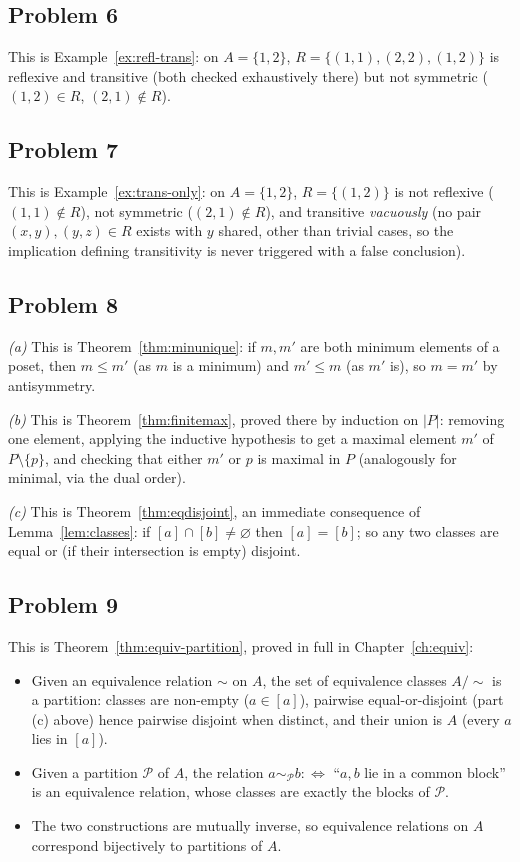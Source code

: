 \subsection*{Problem 6}
This is Example~\ref{ex:refl-trans}: on $A=\{1,2\}$, $R=\{(1,1),(2,2),(1,2)\}$ is reflexive and transitive (both checked exhaustively there) but not symmetric ($(1,2)\in R$, $(2,1)\notin R$).

\subsection*{Problem 7}
This is Example~\ref{ex:trans-only}: on $A=\{1,2\}$, $R=\{(1,2)\}$ is not reflexive ($(1,1)\notin R$), not symmetric ($(2,1)\notin R$), and transitive \emph{vacuously} (no pair $(x,y),(y,z)\in R$ exists with $y$ shared, other than trivial cases, so the implication defining transitivity is never triggered with a false conclusion).

\subsection*{Problem 8}
\emph{(a)} This is Theorem~\ref{thm:minunique}: if $m,m'$ are both minimum elements of a poset, then $m\le m'$ (as $m$ is a minimum) and $m'\le m$ (as $m'$ is), so $m=m'$ by antisymmetry.

\emph{(b)} This is Theorem~\ref{thm:finitemax}, proved there by induction on $|P|$: removing one element, applying the inductive hypothesis to get a maximal element $m'$ of $P\setminus\{p\}$, and checking that either $m'$ or $p$ is maximal in $P$ (analogously for minimal, via the dual order).

\emph{(c)} This is Theorem~\ref{thm:eqdisjoint}, an immediate consequence of Lemma~\ref{lem:classes}: if $[a]\cap[b]\ne\varnothing$ then $[a]=[b]$; so any two classes are equal or (if their intersection is empty) disjoint.

\subsection*{Problem 9}
This is Theorem~\ref{thm:equiv-partition}, proved in full in Chapter~\ref{ch:equiv}:
\begin{itemize}
	\item Given an equivalence relation $\sim$ on $A$, the set of equivalence classes $A/{\sim}$ is a partition: classes are non-empty ($a\in[a]$), pairwise equal-or-disjoint (part (c) above) hence pairwise disjoint when distinct, and their union is $A$ (every $a$ lies in $[a]$).
	\item Given a partition $\mathcal P$ of $A$, the relation $a\sim_{\mathcal P}b:\iff$ ``$a,b$ lie in a common block'' is an equivalence relation, whose classes are exactly the blocks of $\mathcal P$.
	\item The two constructions are mutually inverse, so equivalence relations on $A$ correspond bijectively to partitions of $A$.
\end{itemize}